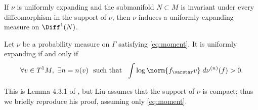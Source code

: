 \begin{rem} \label{rem:restriction_UE}
If $\nu$ is uniformly expanding and the submanifold $N\subset M$ is invariant under every diffeomorphism in the support of $\nu$,
then $\nu$ induces a uniformly expanding measure on $\Diff^1(N)$.
\end{rem}

\begin{lem}\label{lem:weak_UE}
Let $\nu$ be a probability measure on $\Gamma$ satisfying \eqref{eq:moment}.
It is uniformly expanding if and only if
\begin{equation}\label{eq:weak_UE}
\forall v\in T^1M, \ \exists n = n(v) \ \text{ such that } \
\int \log \norm{f_\varstar v } \; d\nu^{(n)}(f) >0.
\end{equation}
\end{lem}

This is Lemma 4.3.1 of \cite{liu_thesis}, but Liu assumes that the support of $\nu$ is compact; thus
we briefly reproduce his proof, assuming only \eqref{eq:moment}.

